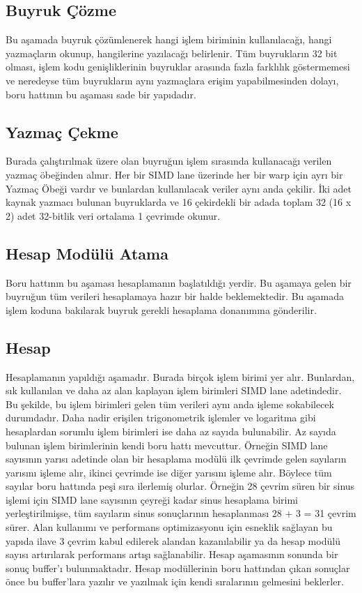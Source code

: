 \subsection{Buyruk Çözme}
Bu aşamada buyruk çözümlenerek hangi işlem biriminin kullanılacağı, hangi yazmaçların okunup, hangilerine yazılacağı belirlenir. Tüm buyrukların 32 bit olması, işlem kodu genişliklerinin buyruklar arasında fazla farklılık göstermemesi ve neredeyse tüm buyrukların aynı yazmaçlara erişim yapabilmesinden dolayı, boru hattının bu aşaması sade bir yapıdadır.
\subsection{Yazmaç Çekme}
Burada çalıştırılmak üzere olan buyruğun işlem sırasında kullanacağı verilen yazmaç öbeğinden alınır. Her bir SIMD lane üzerinde her bir warp için ayrı bir Yazmaç Öbeği vardır ve bunlardan kullanılacak veriler aynı anda çekilir. İki adet kaynak yazmacı bulunan buyruklarda ve 16 çekirdekli bir adada toplam 32 (16 x 2) adet 32-bitlik veri ortalama 1 çevrimde okunur.
\subsection{Hesap Modülü Atama}
Boru hattının bu aşaması hesaplamanın başlatıldığı yerdir. Bu aşamaya gelen bir buyruğun tüm verileri hesaplamaya hazır bir halde beklemektedir. Bu aşamada işlem koduna bakılarak buyruk gerekli hesaplama donanımına gönderilir.
\subsection{Hesap}
Hesaplamanın yapıldığı aşamadır. Burada birçok işlem birimi yer alır. Bunlardan, sık kullanılan ve daha az alan kaplayan işlem birimleri SIMD lane adetindedir. Bu şekilde, bu işlem birimleri gelen tüm verileri aynı anda işleme sokabilecek durumdadır. Daha nadir erişilen trigonometrik işlemler ve logaritma gibi hesaplardan sorumlu işlem birimleri ise daha az sayıda bulunabilir. Az sayıda bulunan işlem birimlerinin kendi boru hattı mevcuttur. Örneğin SIMD lane sayısının yarısı adetinde olan bir hesaplama modülü ilk çevrimde gelen sayıların yarısını işleme alır, ikinci çevrimde ise diğer yarısını işleme alır. Böylece tüm sayılar boru hattında peşi sıra ilerlemiş olurlar. Örneğin 28 çevrim süren bir sinus işlemi için SIMD lane sayısının çeyreği kadar sinus hesaplama birimi yerleştirilmişse, tüm sayıların sinus sonuçlarının hesaplanması 28 + 3 = 31 çevrim sürer. Alan kullanımı ve performans optimizasyonu için esneklik sağlayan bu yapıda ilave 3 çevrim kabul edilerek alandan kazanılabilir ya da hesap modülü sayısı artırılarak performans artışı sağlanabilir. Hesap aşamasının sonunda bir sonuç buffer'ı bulunmaktadır. Hesap modüllerinin boru hattından çıkan sonuçlar önce bu buffer'lara yazılır ve yazılmak için kendi sıralarının gelmesini beklerler. 
